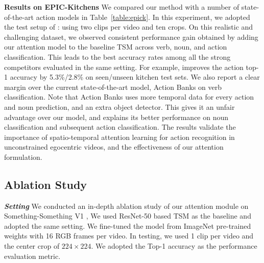 \documentclass[runningheads]{llncs}
\newcommand{\keypoint}[1]{\vspace{0.1cm}\noindent\textbf{#1}\quad}
\begin{document}
\keypoint{Results on EPIC-Kitchens} 
We compared our method with a number of 
state-of-the-art action models
in Table~\ref{table:epick}.
In this experiment, we adopted the test setup of \cite{price2019evaluation}:
using two clips per video and ten crops.
On this realistic and challenging dataset, we observed consistent performance gain
obtained by adding our \shortname{} attention model to the baseline TSM
across verb, noun, and action classification.
This leads to the best accuracy rates among all the 
strong competitors evaluated in the same setting.
For example, \shortname{} improves the action top-1 accuracy by 5.3\%/2.8\% on seen/unseen kitchen test sets.
We also report a clear margin over the current state-of-the-art model,
Action Banks \cite{wu2019long} on verb classification. 
Note that Action Banks uses more temporal data for every action and noun prediction, and an extra object detector. 
This gives it an unfair advantage over our model, and  explains its better performance on noun classification and subsequent action classification.  
The results validate the importance of spatio-temporal attention learning for action recognition in unconstrained egocentric videos,
and the effectiveness of our \shortname{} attention formulation.






\subsection{Ablation Study}

\keypoint{\em Setting}
We conducted an in-depth ablation study of our \shortname{} attention module
on Something-Something V1 \cite{goyal2017something}, 
We used ResNet-50 based TSM \cite{lin2019tsm} as the baseline and adopted the same setting.
We fine-tuned the model from ImageNet pre-trained weights with 16 RGB frames per video.
In testing, we used 1 clip per video
and the center crop of $224\times224$.
We adopted the Top-1 accuracy as the performance evaluation metric.
\end{document}
